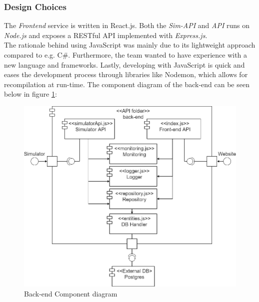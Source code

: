 \subsubsection{Design Choices}


The \textit{Frontend} service is written in React.js. Both the \textit{Sim-API} and \textit{API} runs on \textit{Node.js} and exposes a RESTful API implemented with \textit{Express.js}. \\
The rationale behind using JavaScript was mainly due to its lightweight approach compared to e.g. C\#. Furthermore, the team wanted to have experience with a new language and frameworks. Lastly, developing with JavaScript is quick and eases the development process through libraries like Nodemon, which allows for recompilation at run-time.
The component diagram of the back-end can be seen below in figure \ref{fig:back-end-component-diagram}:

\begin{figure}[H]
    \centering
    \includegraphics[width=1\linewidth]{report/images/component-diagram.png}
    \caption{Back-end Component diagram}
    \label{fig:back-end-component-diagram}
\end{figure}

